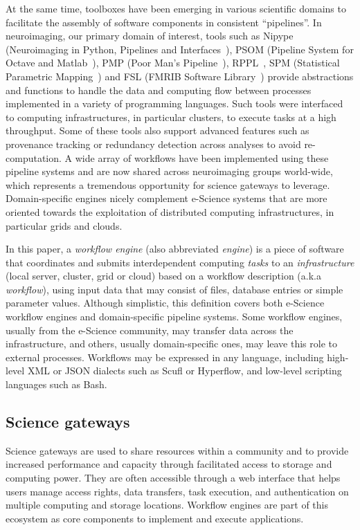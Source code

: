 \documentclass[preprint,3p,twocolumn]{elsarticle}
\begin{document}
At the same time, toolboxes have been emerging in various scientific
domains to facilitate the assembly of software components in
consistent ``pipelines''. In neuroimaging, our primary domain of
interest, tools such as Nipype (Neuroimaging in Python, Pipelines and
Interfaces~\cite{gorgolewski2011nipype}), PSOM (Pipeline System for
Octave and Matlab~\cite{bellec2012pipeline}), 
PMP (Poor Man's Pipeline~\cite{Ad-DabbaghY2006}), RPPL~\cite{1174106}, SPM (Statistical
Parametric Mapping~\cite{ashburner2011spm}) and FSL (FMRIB Software
Library~\cite{Jenkinson2012782}) provide abstractions and functions to
handle the data and computing flow between processes implemented in a
variety of programming languages. Such tools were interfaced to
computing infrastructures, in particular
clusters, to execute tasks at a high throughput. Some of
these tools also support advanced features such as provenance
tracking or  redundancy detection across
analyses to avoid re-computation. A wide array of workflows
have been implemented using these pipeline systems and are now shared across
neuroimaging groups world-wide, which represents a tremendous
opportunity for science gateways to leverage. Domain-specific engines
nicely complement e-Science systems that are more oriented towards the
exploitation of distributed computing infrastructures, in particular
grids and clouds.

In this paper, a
\emph{workflow engine} (also abbreviated \emph{engine}) is a piece of
software that coordinates and submits interdependent computing \emph{tasks} to an
\emph{infrastructure} (local server, cluster, grid or cloud) based on
a workflow description (a.k.a \emph{workflow}), using input data
that may consist of files, database entries or simple parameter
values. Although simplistic, this definition covers both e-Science workflow engines and
domain-specific pipeline systems.
Some workflow engines, 
usually from the e-Science community, 
may transfer data across the infrastructure, and others, usually
domain-specific ones, may leave this role to external processes. Workflows
may be expressed in any language, including high-level XML or JSON
dialects such as Scufl or Hyperflow, and low-level scripting languages
such as Bash.

\subsection{Science gateways}

\label{sec:intro_sg}

Science gateways are used to share resources within a community and to
provide increased performance and capacity through facilitated access
to storage and computing power. They are often accessible through a
web interface that helps users manage access rights, data transfers,
task execution, and authentication on multiple computing and storage
locations. Workflow engines are part of this ecosystem as core
components to implement and execute
applications. 
\end{document}
